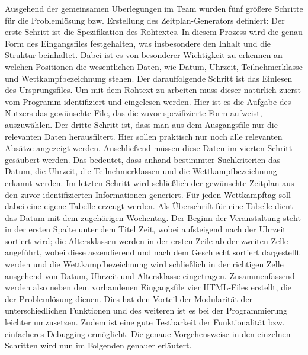 Ausgehend der gemeinsamen Überlegungen im Team wurden fünf größere Schritte für die Problemlösung bzw. Erstellung des Zeitplan-Generators definiert: Der erste Schritt ist die Spezifikation des Rohtextes. In diesem Prozess wird die genau Form des Eingangsfiles festgehalten, was insbesondere den Inhalt und die Struktur beinhaltet. Dabei ist es von besonderer Wichtigkeit zu erkennen an welchen Positionen die wesentlichen Daten, wie Datum, Uhrzeit, Teilnehmerklasse und Wettkampfbezeichnung stehen. Der darauffolgende Schritt ist das Einlesen des Ursprungsfiles. Um mit dem Rohtext zu arbeiten muss dieser natürlich zuerst vom Programm identifiziert und eingelesen werden. Hier ist es die Aufgabe des Nutzers das gewünschte File, das die zuvor spezifizierte Form aufweist, auszuwählen. Der dritte Schritt ist, dass man aus dem Ausgangsfile nur die relevanten Daten herausfiltert. Hier sollen praktisch nur noch alle relevanten Absätze angezeigt werden. Anschließend müssen diese Daten im vierten Schritt gesäubert werden. Das bedeutet, dass anhand bestimmter Suchkriterien das Datum, die Uhrzeit, die Teilnehmerklassen und die Wettkampfbezeichnung erkannt werden. Im letzten Schritt wird schließlich der gewünschte Zeitplan aus den zuvor identifizierten Informationen generiert. Für jeden Wettkampftag soll dabei eine eigene Tabelle erzeugt werden. Als Überschrift für eine Tabelle dient das Datum mit dem zugehörigen Wochentag. Der Beginn der Veranstaltung steht in der ersten Spalte unter dem Titel Zeit, wobei aufsteigend nach der Uhrzeit sortiert wird; die Altersklassen werden in der ersten Zeile ab der zweiten Zelle angeführt, wobei diese aszendierend und nach dem Geschlecht sortiert dargestellt werden und die Wettkampfbezeichnung wird schließlich in der richtigen Zelle ausgehend von Datum, Uhrzeit und Altersklasse eingetragen. 
Zusammenfassend werden also neben dem vorhandenen Eingangsfile vier HTML-Files erstellt, die der Problemlösung dienen. Dies hat den Vorteil der Modularität der unterschiedlichen Funktionen und des weiteren ist es bei der Programmierung leichter umzusetzen. Zudem ist eine gute Testbarkeit der Funktionalität bzw. einfacheres Debugging ermöglicht. Die genaue Vorgehensweise in den einzelnen Schritten wird nun im Folgenden genauer erläutert.

